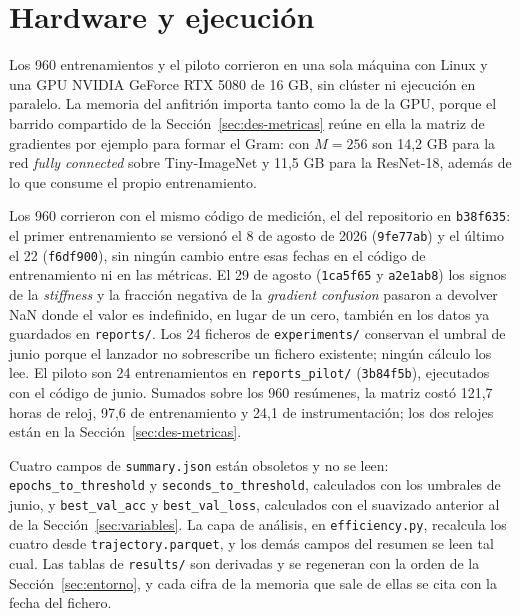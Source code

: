 \section{Hardware y ejecución}
\label{sec:hardware}

Los 960 entrenamientos y el piloto corrieron en una sola máquina con Linux y una GPU NVIDIA GeForce RTX 5080 de 16 GB, sin clúster ni ejecución en paralelo. La memoria del anfitrión importa tanto como la de la GPU, porque el barrido compartido de la Sección~\ref{sec:des-metricas} reúne en ella la matriz de gradientes por ejemplo para formar el Gram: con $M = 256$ son 14,2 GB para la red \emph{fully connected} sobre Tiny-ImageNet y 11,5 GB para la ResNet-18, además de lo que consume el propio entrenamiento.

Los 960 corrieron con el mismo código de medición, el del repositorio en \texttt{b38f635}: el primer entrenamiento se versionó el 8 de agosto de 2026 (\texttt{9fe77ab}) y el último el 22 (\texttt{f6df900}), sin ningún cambio entre esas fechas en el código de entrenamiento ni en las métricas. El 29 de agosto (\texttt{1ca5f65} y \texttt{a2e1ab8}) los signos de la \emph{stiffness} y la fracción negativa de la \emph{gradient confusion} pasaron a devolver NaN donde el valor es indefinido, en lugar de un cero, también en los datos ya guardados en \texttt{reports/}. Los 24 ficheros de \texttt{experiments/} conservan el umbral de junio porque el lanzador no sobrescribe un fichero existente; ningún cálculo los lee. El piloto son 24 entrenamientos en \texttt{reports\_pilot/} (\texttt{3b84f5b}), ejecutados con el código de junio. Sumados sobre los 960 resúmenes, la matriz costó 121,7 horas de reloj, 97,6 de entrenamiento y 24,1 de instrumentación; los dos relojes están en la Sección~\ref{sec:des-metricas}.

Cuatro campos de \texttt{summary.json} están obsoletos y no se leen: \texttt{epochs\_to\_threshold} y \texttt{seconds\_to\_threshold}, calculados con los umbrales de junio, y \texttt{best\_val\_acc} y \texttt{best\_val\_loss}, calculados con el suavizado anterior al de la Sección~\ref{sec:variables}. La capa de análisis, en \texttt{efficiency.py}, recalcula los cuatro desde \texttt{trajectory.parquet}, y los demás campos del resumen se leen tal cual. Las tablas de \texttt{results/} son derivadas y se regeneran con la orden de la Sección~\ref{sec:entorno}, y cada cifra de la memoria que sale de ellas se cita con la fecha del fichero.
